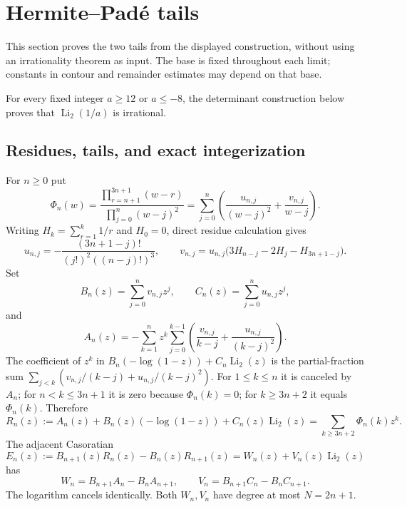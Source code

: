 \section{Hermite--Pad\'e tails}\label{sec:hp}
This section proves the two tails from the displayed construction, without
using an irrationality theorem as input.  The base is fixed throughout each
limit; constants in contour and remainder estimates may depend on that base.

\begin{theorem}\label{thm:hp-tail}
For every fixed integer $a\ge12$ or $a\le-8$, the determinant construction
below proves that $\operatorname{Li}_2(1/a)$ is irrational.
\end{theorem}

\subsection{Residues, tails, and exact integerization}
For $n\ge0$ put
\begin{equation}\label{eq:hp-phi}
 \Phi_n(w)=\frac{\prod_{r=n+1}^{3n+1}(w-r)}
                   {\prod_{j=0}^{n}(w-j)^2}
 =\sum_{j=0}^{n}\left(\frac{u_{n,j}}{(w-j)^2}
                         +\frac{v_{n,j}}{w-j}\right).
\end{equation}
Writing $H_k=\sum_{r=1}^k1/r$ and $H_0=0$, direct residue calculation gives
\begin{equation}\label{eq:hp-residues}
 u_{n,j}=-\frac{(3n+1-j)!}{(j!)^2((n-j)!)^3},\qquad
 v_{n,j}=u_{n,j}\bigl(3H_{n-j}-2H_j-H_{3n+1-j}\bigr).
\end{equation}
Set
\[
 B_n(z)=\sum_{j=0}^n v_{n,j}z^j,\qquad
 C_n(z)=\sum_{j=0}^n u_{n,j}z^j,
\]
and
\[
 A_n(z)=-\sum_{k=1}^{n}z^k\sum_{j=0}^{k-1}
       \left(\frac{v_{n,j}}{k-j}+\frac{u_{n,j}}{(k-j)^2}\right).
\]
The coefficient of $z^k$ in $B_n(-\log(1-z))+C_n\operatorname{Li}_2(z)$ is
the partial-fraction sum $\sum_{j<k}(v_{n,j}/(k-j)+u_{n,j}/(k-j)^2)$.
For $1\le k\le n$ it is canceled by $A_n$; for $n<k\le3n+1$ it is zero
because $\Phi_n(k)=0$; for $k\ge3n+2$ it equals $\Phi_n(k)$.  Therefore
\begin{equation}\label{eq:hp-tail-series}
 R_n(z):=A_n(z)+B_n(z)(-\log(1-z))+C_n(z)\operatorname{Li}_2(z)
       =\sum_{k\ge3n+2}\Phi_n(k)z^k.
\end{equation}
The adjacent Casoratian
\begin{equation}\label{eq:hp-casoratian}
 E_n(z):=B_{n+1}(z)R_n(z)-B_n(z)R_{n+1}(z)
       =W_n(z)+V_n(z)\operatorname{Li}_2(z)
\end{equation}
has
\[
 W_n=B_{n+1}A_n-B_nA_{n+1},\qquad
 V_n=B_{n+1}C_n-B_nC_{n+1}.
\]
The logarithm cancels identically.  Both $W_n,V_n$ have degree at most
$N=2n+1$.

